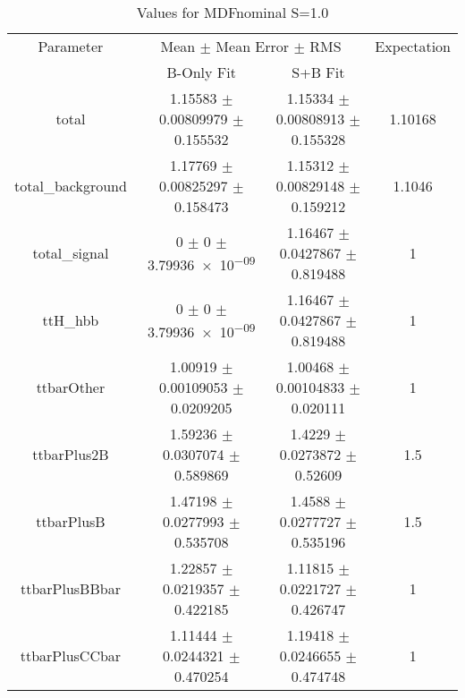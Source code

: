\begin{table}
\centering
\caption{Values for MDFnominal S=1.0}
\begin{tabular}{cccc}
\toprule
Parameter & \multicolumn{2}{c}{Mean $\pm$ Mean Error $\pm$ RMS} & Expectation\\
 & B-Only Fit & S+B Fit & \\
\midrule
total & \num{1.15583} $\pm$ \num{0.00809979} $\pm$ \num{0.155532} & \num{1.15334} $\pm$ \num{0.00808913} $\pm$ \num{0.155328} & \num{1.10168}\\
total\_background & \num{1.17769} $\pm$ \num{0.00825297} $\pm$ \num{0.158473} & \num{1.15312} $\pm$ \num{0.00829148} $\pm$ \num{0.159212} & \num{1.1046}\\
total\_signal & \num{0} $\pm$ \num{0} $\pm$ \num{3.79936e-09} & \num{1.16467} $\pm$ \num{0.0427867} $\pm$ \num{0.819488} & \num{1}\\
ttH\_hbb & \num{0} $\pm$ \num{0} $\pm$ \num{3.79936e-09} & \num{1.16467} $\pm$ \num{0.0427867} $\pm$ \num{0.819488} & \num{1}\\
ttbarOther & \num{1.00919} $\pm$ \num{0.00109053} $\pm$ \num{0.0209205} & \num{1.00468} $\pm$ \num{0.00104833} $\pm$ \num{0.020111} & \num{1}\\
ttbarPlus2B & \num{1.59236} $\pm$ \num{0.0307074} $\pm$ \num{0.589869} & \num{1.4229} $\pm$ \num{0.0273872} $\pm$ \num{0.52609} & \num{1.5}\\
ttbarPlusB & \num{1.47198} $\pm$ \num{0.0277993} $\pm$ \num{0.535708} & \num{1.4588} $\pm$ \num{0.0277727} $\pm$ \num{0.535196} & \num{1.5}\\
ttbarPlusBBbar & \num{1.22857} $\pm$ \num{0.0219357} $\pm$ \num{0.422185} & \num{1.11815} $\pm$ \num{0.0221727} $\pm$ \num{0.426747} & \num{1}\\
ttbarPlusCCbar & \num{1.11444} $\pm$ \num{0.0244321} $\pm$ \num{0.470254} & \num{1.19418} $\pm$ \num{0.0246655} $\pm$ \num{0.474748} & \num{1}\\
\bottomrule
\end{tabular}
\end{table}